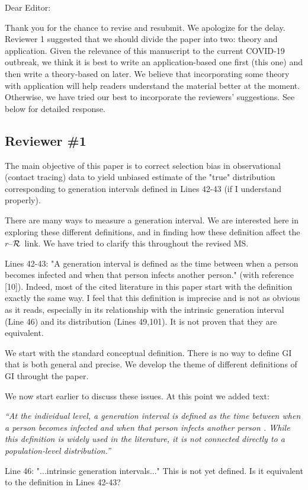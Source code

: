 \documentclass[12pt]{article}
\newcommand{\rR}{\mbox{$r$--$\cal R$}}
\newcommand{\reviewer}{\subsection*}
\newcommand{\revtext}{\textsf}
\newcommand{\newtext}[1]{\textsl{``#1''}}
\begin{document}
\noindent Dear Editor:

Thank you for the chance to revise and resubmit.
We apologize for the delay.
Reviewer 1 suggested that we should divide the paper into two: theory and application.
Given the relevance of this manuscript to the current COVID-19 outbreak, we think it is best to write an application-based one first (this one) and then write a theory-based on later.
We believe that incorporating some theory with application will help readers understand the material better at the moment.
Otherwise, we have tried our best to incorporate the reviewers' suggestions.
See below for detailed response.

\reviewer{Reviewer \#1}

\revtext{The main objective of this paper is to correct selection bias in observational
(contact tracing) data to yield unbiased estimate of the "true" distribution
corresponding to generation intervals defined in Lines 42-43 (if I understand
properly).}

There are many ways to measure a generation interval. We are interested here in exploring these different definitions, and in finding how these definition affect the \rR\ link. We have tried to clarify this throughout the revised MS.

\revtext{Lines 42-43: "A generation interval is defined as the time between when a
person becomes infected and when that person infects another person."
(with reference [10]). Indeed, most of the cited literature in this paper
start with the definition exactly the same way. I feel that this definition
is imprecise and is not as obvious as it reads, especially in its relationship
with the intrinsic generation interval (Line 46) and its distribution (Lines
49,101). It is not proven that they are equivalent.}

We start with the standard conceptual definition. There is no way to define GI that is both general and precise. We develop the theme of different definitions of GI throught the paper.

We now start earlier to discuss these issues. At this point we added text:

\newtext{At the individual level, a generation \emph{interval} is defined as the time between when a person becomes infected and when that person infects another person \citep{svensson2007note}.
While this definition is widely used in the literature, it is not connected directly to a population-level \emph{distribution}.}

\revtext{Line 46: "...intrinsic generation intervals..." This is not yet defined. Is it equivalent to the definition in Lines 42-43?}
\end{document}
